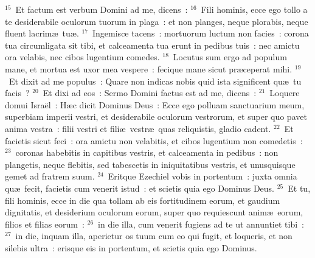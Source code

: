${}^{15}$~Et factum est verbum Domini ad me, dicens~:
${}^{16}$~Fili hominis, ecce ego tollo a te desiderabile oculorum tuorum in plaga~: et non planges, neque plorabis, neque fluent lacrim\ae\ tu\ae .
${}^{17}$~Ingemisce tacens~: mortuorum luctum non facies~: corona tua circumligata sit tibi, et calceamenta tua erunt in pedibus tuis~: nec amictu ora velabis, nec cibos lugentium comedes.
${}^{18}$~Locutus sum ergo ad populum mane, et mortua est uxor mea vespere~: fecique mane sicut pr\ae ceperat mihi.
${}^{19}$~Et dixit ad me populus~: Quare non indicas nobis quid ista significent qu\ae\ tu facis~?
${}^{20}$~Et dixi ad eos~: Sermo Domini factus est ad me, dicens~:
${}^{21}$~Loquere domui Isra\"el~: H\ae c dicit Dominus Deus~: Ecce ego polluam sanctuarium meum, superbiam imperii vestri, et desiderabile oculorum vestrorum, et super quo pavet anima vestra~: filii vestri et fili\ae\ vestr\ae\ quas reliquistis, gladio cadent.
${}^{22}$~Et facietis sicut feci~: ora amictu non velabitis, et cibos lugentium non comedetis~:
${}^{23}$~coronas habebitis in capitibus vestris, et calceamenta in pedibus~: non plangetis, neque flebitis, sed tabescetis in iniquitatibus vestris, et unusquisque gemet ad fratrem suum.
${}^{24}$~Eritque Ezechiel vobis in portentum~: juxta omnia qu\ae\ fecit, facietis cum venerit istud~: et scietis quia ego Dominus Deus.
${}^{25}$~Et tu, fili hominis, ecce in die qua tollam ab eis fortitudinem eorum, et gaudium dignitatis, et desiderium oculorum eorum, super quo requiescunt anim\ae\ eorum, filios et filias eorum~:
${}^{26}$~in die illa, cum venerit fugiens ad te ut annuntiet tibi~:
${}^{27}$~in die, inquam illa, aperietur os tuum cum eo qui fugit, et loqueris, et non silebis ultra~: erisque eis in portentum, et scietis quia ego Dominus.

